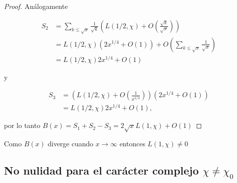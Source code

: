 \begin{proof}
Análogamente  

$$
\begin{aligned}
S_2 & =\sum_{k \leq \sqrt{x}} \frac{1}{\sqrt{k}}\left(L(1 / 2, \chi)+O\left(\frac{\sqrt{k} }{\sqrt{x}}\right)\right) \\
& =L(1 / 2, \chi)\left(2 x^{1 / 4}+O(1)\right)+O\left(\sum_{k \leq \sqrt{x}} \frac{1}{\sqrt{x}}\right) \\
& =L(1 / 2, \chi) 2 x^{1 / 4}+O(1)
\end{aligned}
$$

y


\begin{align*}
    S_3 & =\left(L(1 / 2, \chi)+O\left(\frac{1}{x^{1 / 4}}\right)\right)\left(2 x^{1 / 4}+O(1)\right) \\
& =L(1 / 2, \chi) 2 x^{1 / 4}+O(1),
\end{align*}

por lo tanto $B(x)=S_1+S_2-S_3=2 \sqrt{x}L(1,\chi)+O(1)$

\end{proof}

Como $B(x)$ diverge cuando $x\to\infty$ entonces $L(1,\chi)\neq0$

\subsection{No nulidad para el carácter complejo \texorpdfstring{$\chi\neq\chi_0$}{Lg}}

\lipsum[1]